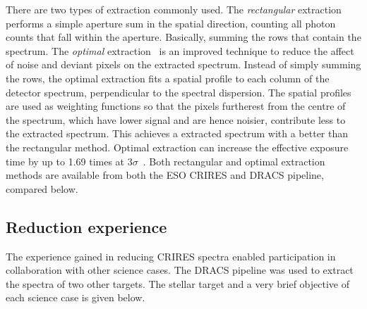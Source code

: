There are two types of extraction commonly used.
The \emph{rectangular} extraction performs a simple aperture sum in the spatial direction, counting all photon counts that fall within the aperture.
Basically, summing the rows that contain the spectrum.
The \emph{optimal} extraction~\citep{horne_optimal_1986} is an improved technique to reduce the affect of noise and deviant pixels on the extracted spectrum.
Instead of simply summing the rows, the optimal extraction fits a spatial profile to each column of the detector spectrum, perpendicular to the spectral dispersion.
The spatial profiles are used as weighting functions so that the pixels furtherest from the centre of the spectrum, which have lower signal and are hence noisier, contribute less to the extracted spectrum.
This achieves a extracted spectrum with a better \snr{} than the rectangular method.
Optimal extraction can increase the effective exposure time by up to 1.69 times at \(3 \sigma\)~\citep{horne_optimal_1986}.
Both rectangular and optimal extraction methods are available from both the {ESO} {CRIRES} and {DRACS} pipeline, compared below.







\subsection{Reduction experience}
\label{subsec:experience}
The experience gained in reducing {CRIRES} spectra enabled participation in collaboration with other science cases.
The {DRACS} pipeline was used to extract the spectra of two other targets.
The stellar target and a very brief objective of each science case is given below.

